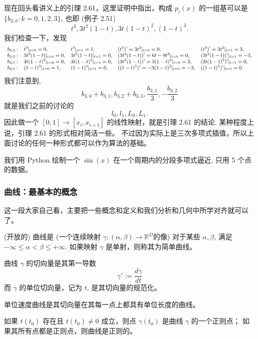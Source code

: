 \documentclass[a4paper]{ctexart}
\begin{document}
{现在回头看讲义上的引理 2.61，这里证明中指出，构成 $p_i(x)$ 的一组基可以是 $\{b_{3,k} : k = 0, 1, 2, 3\}$, 
也即 (例子 2.51)
$$
t^3, 3t^2(1-t), 3t(1-t)^2, (1-t)^3.
$$ 
我们检查一下，发现
$$
\small
\begin{array}{lllll}
b_{3,3}: & t^3|_{t = 0} = 0, & t^3|_{t = 1} = 1, & (t^3)' = 3t^2|_{t = 0} = 0, & (t^3)' = 3t^2|_{t = 1} = 3, \\ 
b_{3,2}: & 3t^2(1 - t)|_{t = 0} =  0, & 3t^2(1 - t)|_{t = 1} = 0, & (3t^2(1 - t))' = 6t - 9 t^2|_{t = 0} = 0, & (3t^2(1 - t))'|_{t = 1} = -3, \\ 
b_{3,1}: & 3t(1 - t)^2|_{t = 0} =  0, & 3t(1 - t)^2|_{t = 1} = 0, & (3t^2(1 - t))' = 3(1 - t)^2|_{t = 0} = 3, & (3t(1 - t)^2)'|_{t = 1} = 0, \\ 
b_{3,0}: & (1 - t)^3|_{t = 0} = 1, & (1 - t)^3|_{t = 1} = 0, & ((1 - t)^3)' = -3(1 - t)^2|_{t = 0} = -3, & ((1 - t)^3)'|_{t = 1} = 0. \\ 
\end{array}
$$
我们注意到, 
$$
b_{3, 0} + b_{3, 1}, b_{3, 2} + b_{3, 3}, \frac{b_{3, 1}}{3}, -\frac{b_{3, 2}}{3}
$$
就是我们之前的讨论的 
$$
l_0, l_1, L_0, L_1.
$$
因此做一个 $[0, 1] \to [x_i, x_{i + 1}]$ 的线性映射，就是引理 2.61 的结论. 某种程度上说，引理 2.61 的形式相对简洁一些。
不过因为实际上是三次多项式插值，所以上面讨论的任何一种形式都可以作为算法的基础。

我们用 Python 绘制一个 $\sin(x)$ 在一个周期内的分段多项式逼近, 只用 $5$ 个点的数据。

\subsubsection{曲线：最基本的概念}

这一段大家自己看，主要把一些概念和定义和我们分析和几何中所学对齐就可以了。

 (开放的) 曲线是 (一个连续映射 $\gamma : (\alpha, \beta) \rightarrow \mathbb{R}^D$的像) 
对于某些 $\alpha, \beta$, 满足 $-\infty \leq \alpha < \beta \leq +\infty$. 如果映射 $\gamma$ 是单射，则称其为简单曲线。

曲线 $\gamma$ 的切向量是其第一导数
$$
\gamma' := \frac{d\gamma}{dt}
$$
而 $\gamma$ 的单位切向量，记为 $t$, 是其切向量的规范化。

 单位速度曲线是其切向量在其每一点上都具有单位长度的曲线。

 如果 $t(t_0)$ 存在且 $t(t_0) \neq 0$ 成立，则点 $\gamma(t_0)$ 是曲线 $\gamma$ 的一个正则点；
如果其所有点都是正则点，则曲线是正则的。

}
\end{document}
